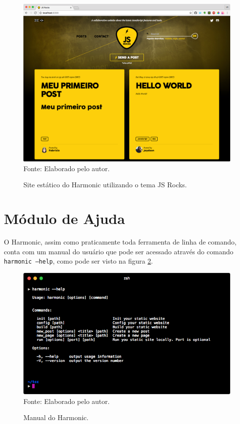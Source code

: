 \documentclass[ppginf, pep]{esinucpel}
\newcommand{\code}[1]{\texttt{#1}}
\begin{document}
\begin{figure}[htbp]
    \centering
    \caption{Site estático do Harmonic utilizando o tema JS Rocks.}
    \vspace{5pt}
    \includegraphics[width=\textwidth]{tema_jsrocks}
    \\Fonte: Elaborado pelo autor.
    \label{fig:tema_jsrocks}
\end{figure}

\section{Módulo de Ajuda}

O Harmonic, assim como praticamente toda ferramenta de linha de comando, conta com um manual do usuário que pode ser acessado através do comando \code{harmonic --help}, como pode ser visto na figura \ref{fig:harmonic_help}. %

\begin{figure}[htbp]
    \centering
    \caption{Manual do Harmonic.}
    \vspace{5pt}
    \includegraphics[width=\textwidth]{harmonic_help}
    \\Fonte: Elaborado pelo autor.
    \label{fig:harmonic_help}
\end{figure}
\end{document}
